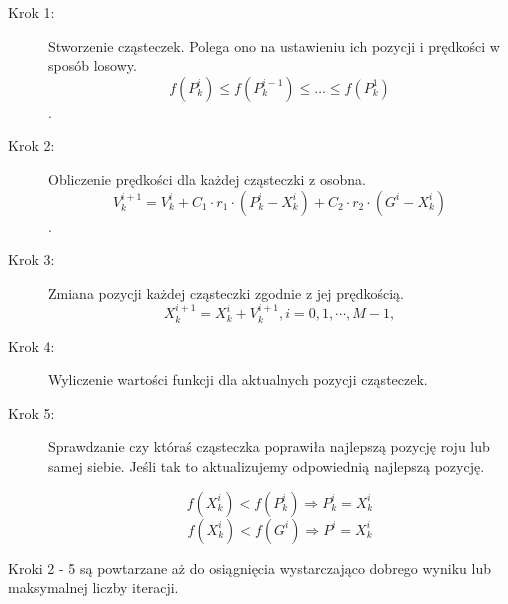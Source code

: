\begin{description}
  \item[Krok 1:] 
     \par Stworzenie cząsteczek. Polega ono na ustawieniu ich pozycji i prędkości w sposób losowy. 
  \[f(P^{i}_{k}) \le f(P^{i-1}_{k}) \le \ldots \le f(P^{1}_{k})\].
  \item[Krok 2:]
    \par Obliczenie prędkości dla każdej cząsteczki z osobna. 
\[V^{i+1}_{k} = V^{i}_{k} + C_{1} \cdot r_{1} \cdot (P^{i}_{k} - X^{i}_{k}) + C_{2} \cdot r_{2} \cdot (G^{i} - X^{i}_{k})\].
  \item[Krok 3:]
        \par Zmiana pozycji każdej cząsteczki zgodnie z jej prędkością.
\[X^{i+1}_{k} = X^{i}_{k} + V^{i+1}_{k}, i = 0,1,\cdots, M-1,\]
  \item[Krok 4:]
        \par Wyliczenie wartości funkcji dla aktualnych pozycji cząsteczek.
  \item[Krok 5:] 
      \par Sprawdzanie czy któraś cząsteczka poprawiła najlepszą pozycję roju lub samej siebie. Jeśli tak to aktualizujemy odpowiednią najlepszą pozycję.

    \[  f(X^{i}_{k}) < f(P^{i}_{k}) \Longrightarrow P^{i}_{k} = X^{i}_{k}\]
\[  f(X^{i}_{k}) < f(G^{i}) \Longrightarrow  P^{i} = X^{i}_{k}\]


\end{description}
    \par Kroki 2 - 5 są powtarzane aż do osiągnięcia wystarczająco dobrego wyniku lub maksymalnej liczby iteracji.
